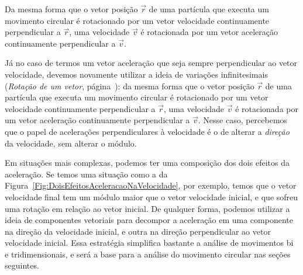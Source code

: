 \begin{marginfigure}
\centering
   \caption{Da mesma forma que o vetor posição $\vec{r}$ de uma partícula que executa um movimento circular é rotacionado por um vetor velocidade continuamente perpendicular a $\vec{r}$, uma velocidade $\vec{v}$ é rotacionada por um vetor aceleração continuamente perpendicular a $\vec{v}$.}
\end{marginfigure}


Já no caso de termos um vetor aceleração que seja sempre perpendicular ao vetor velocidade, devemos novamente utilizar a ideia de variações infinitesimais (\emph{Rotação de um vetor}, página~\pageref{Disc:RotVetor}): da mesma forma que o vetor posição $\vec{r}$ de uma partícula que executa um movimento circular é rotacionado por um vetor velocidade continuamente perpendicular a $\vec{r}$, uma velocidade $\vec{v}$ é rotacionada por um vetor aceleração continuamente perpendicular a $\vec{v}$. Nesse caso, percebemos que o papel de acelerações perpendiculares à velocidade é o de alterar a \emph{direção} da velocidade, sem alterar o módulo.

Em situações mais complexas, podemos ter uma composição dos dois efeitos da aceleração. Se temos uma situação como a da Figura~\ref{Fig:DoisEfeitosAceleracaoNaVelocidade}, por exemplo, temos que o vetor velocidade final tem um módulo maior que o vetor velocidade inicial, e que sofreu uma rotação em relação ao vetor inicial. De qualquer forma, podemos utilizar a ideia de componentes vetoriais para decompor a aceleração em uma componente na direção da velocidade inicial, e outra na direção perpendicular ao vetor velocidade inicial. Essa estratégia simplifica bastante a análise de movimentos bi e tridimensionais, e será a base para a análise do movimento circular nas seções seguintes.


